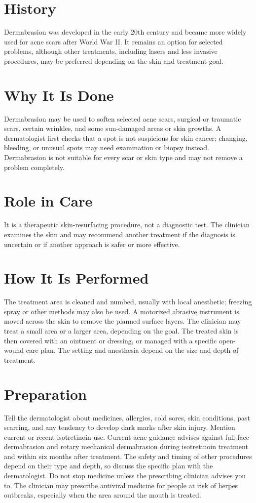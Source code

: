 \section*{History}
Dermabrasion was developed in the early 20th century and became more widely used for acne scars after World War II. It remains an option for selected problems, although other treatments, including lasers and less invasive procedures, may be preferred depending on the skin and treatment goal.

\section*{Why It Is Done}
Dermabrasion may be used to soften selected acne scars, surgical or traumatic scars, certain wrinkles, and some sun-damaged areas or skin growths. A dermatologist first checks that a spot is not suspicious for skin cancer; changing, bleeding, or unusual spots may need examination or biopsy instead. Dermabrasion is not suitable for every scar or skin type and may not remove a problem completely.

\section*{Role in Care}
It is a therapeutic skin-resurfacing procedure, not a diagnostic test. The clinician examines the skin and may recommend another treatment if the diagnosis is uncertain or if another approach is safer or more effective.

\section*{How It Is Performed}
The treatment area is cleaned and numbed, usually with local anesthetic; freezing spray or other methods may also be used. A motorized abrasive instrument is moved across the skin to remove the planned surface layers. The clinician may treat a small area or a larger area, depending on the goal. The treated skin is then covered with an ointment or dressing, or managed with a specific open-wound care plan. The setting and anesthesia depend on the size and depth of treatment.

\section*{Preparation}
Tell the dermatologist about medicines, allergies, cold sores, skin conditions, past scarring, and any tendency to develop dark marks after skin injury. Mention current or recent isotretinoin use. Current acne guidance advises against full-face dermabrasion and rotary mechanical dermabrasion during isotretinoin treatment and within six months after treatment. The safety and timing of other procedures depend on their type and depth, so discuss the specific plan with the dermatologist. Do not stop medicine unless the prescribing clinician advises you to. The clinician may prescribe antiviral medicine for people at risk of herpes outbreaks, especially when the area around the mouth is treated.

